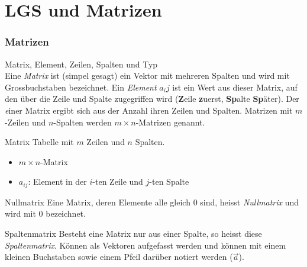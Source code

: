 \graphicspath{{images/}}
\section*{LGS und Matrizen}

\subsubsection*{Matrizen}

    \begin{definition}{{Matrix, Element, Zeilen, Spalten und Typ}}\\
        Eine \textit{Matrix} ist (simpel gesagt) ein Vektor mit mehreren Spalten 
        und wird mit Grossbuchstaben bezeichnet.
        Ein \textit{Element} $a_ij$ ist ein Wert aus dieser Matrix,
        auf den über die Zeile und Spalte zugegriffen wird (\textbf{Z}eile \textbf{z}uerst,
        \textbf{Sp}alte \textbf{Sp}äter).
        Der \textit einer Matrix ergibt sich aus der Anzahl ihren Zeilen und Spalten.
        Matrizen mit $m$-Zeilen und $n$-Spalten werden $m\times n$-Matrizen genannt.
    \end{definition}

    \begin{concept}{Matrix}
        Tabelle mit $m$ Zeilen und $n$ Spalten.
        \begin{itemize}
            \item $m \times n$-Matrix
            \item $a_{ij}$: Element in der $i$-ten Zeile und $j$-ten Spalte
        \end{itemize}
    \end{concept}

    \begin{definition}{Nullmatrix}
        Eine Matrix, deren Elemente alle gleich $0$ sind, heisst \textit{Nullmatrix} und wird mit $0$ bezeichnet.
    \end{definition}

    \begin{definition}{Spaltenmatrix}
        Besteht eine Matrix nur aus einer Spalte, so heisst diese \textit{Spaltenmatrix}.
        Können als Vektoren aufgefasst werden und können mit einem kleinen Buchstaben 
        sowie einem Pfeil darüber notiert werden ($\vec{a}$). 
    \end{definition}
    
